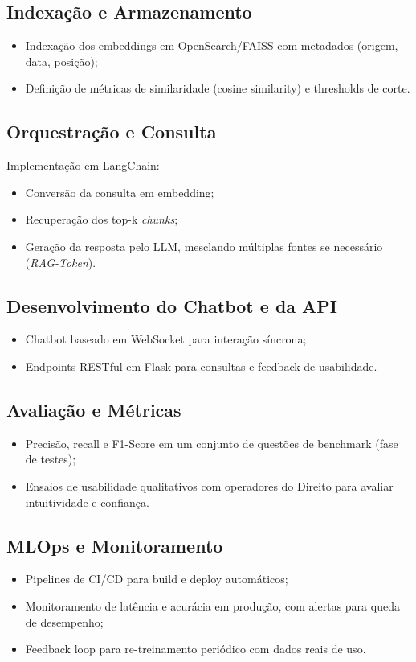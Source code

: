 \begin{description}
\subsection{Indexação e Armazenamento}
\begin{itemize}[label=\textbullet]
  \item Indexação dos embeddings em OpenSearch/FAISS com metadados (origem, data, posição);
  \item Definição de métricas de similaridade (cosine similarity) e thresholds de corte.
\end{itemize}

\subsection{Orquestração e Consulta}
Implementação em LangChain:
\begin{itemize}[label=\textbullet]
  \item Conversão da consulta em embedding;
  \item Recuperação dos top-k \emph{chunks};
  \item Geração da resposta pelo LLM, mesclando múltiplas fontes se necessário (\emph{RAG-Token}).
\end{itemize}

\subsection{Desenvolvimento do Chatbot e da API}
\begin{itemize}[label=\textbullet]
  \item Chatbot baseado em WebSocket para interação síncrona;
  \item Endpoints RESTful em Flask para consultas e feedback de usabilidade.
\end{itemize}

\subsection{Avaliação e Métricas}
\begin{itemize}[label=\textbullet]
  \item Precisão, recall e F1-Score em um conjunto de questões de benchmark (fase de testes);
  \item Ensaios de usabilidade qualitativos com operadores do Direito para avaliar intuitividade e confiança.
\end{itemize}

\subsection{MLOps e Monitoramento}
\begin{itemize}[label=\textbullet]
  \item Pipelines de CI/CD para build e deploy automáticos;
  \item Monitoramento de latência e acurácia em produção, com alertas para queda de desempenho;
  \item Feedback loop para re-treinamento periódico com dados reais de uso.
\end{itemize}


\end{description}
